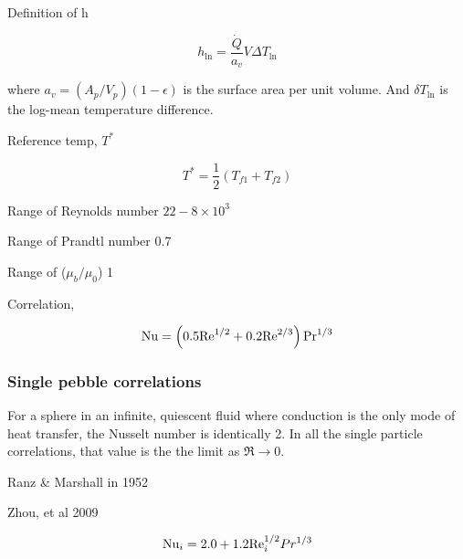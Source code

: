 Definition of h

\begin{equation}
	h_{\ln} = \frac{\dot{Q}}{a_v}V\Delta T_{\ln}
\end{equation}

where $a_v = (A_p/V_p)(1-\epsilon)$ is the surface area per unit volume. And $\delta T_{\ln}$ is the log-mean temperature difference.

Reference temp, $T^*$

\begin{equation}
	T^* = \frac{1}{2}(T_{f1} + T_{f2})
\end{equation}

Range of Reynolds number
$22-8 \times 10^3$

Range of Prandtl number
0.7

Range of ($\mu_b/\mu_0$)
1

Correlation,

\begin{equation}
	\mathrm{Nu} = \left( 0.5 \mathrm{Re}^{1/2} + 0.2\mathrm{Re}^{2/3} \right)\mathrm{Pr}^{1/3}
\end{equation}




\subsubsection{Single pebble correlations}

For a sphere in an infinite, quiescent fluid where conduction is the only mode of heat transfer, the Nusselt number is identically 2. In all the single particle correlations, that value is the the limit as $\Re \rightarrow 0$. 

Ranz \& Marshall in 1952 

Zhou, et al 2009

\begin{equation}
	\mathrm{Nu}_i = 2.0 + 1.2\mathrm{Re}_i^{1/2}Pr^{1/3}
\end{equation}